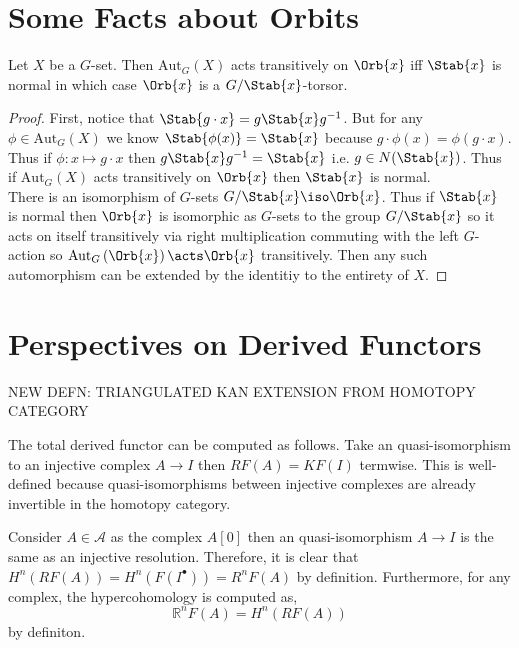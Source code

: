 \documentclass[12pt]{article}
\begin{document}
\section{Some Facts about Orbits}

\renewcommand{\Aut}[2]{\mathrm{Aut}_{#1}\left(#2 \right)}

\begin{prop}
Let $X$ be a $G$-set. Then $\Aut{G}{X}$ acts transitively on $\Orb{x}$ iff $\Stab{x}$ is normal in which case $\Orb{x}$ is a $G/\Stab{x}$-torsor.
\end{prop}

\begin{proof}
First, notice that $\Stab{g \cdot x} = g \Stab{x} g^{-1}$. But for any $\phi \in \Aut{G}{X}$ we know $\Stab{\phi(x)} = \Stab{x}$ because $g \cdot \phi(x) = \phi(g \cdot x)$. Thus if $\phi : x \mapsto g \cdot x$ then $g \Stab{x} g^{-1} = \Stab{x}$ i.e. $g \in N(\Stab{x})$. Thus if $\Aut{G}{X}$ acts transitively on $\Orb{x}$ then $\Stab{x}$ is normal.
\bigskip\\
There is an isomorphism of $G$-sets $G / \Stab{x} \iso \Orb{x}$. Thus if $\Stab{x}$ is normal then $\Orb{x}$ is isomorphic as $G$-sets to the group $G / \Stab{x}$ so it acts on itself transitively via right multiplication commuting with the left $G$-action so $\Aut{G}{\Orb{x}} \acts \Orb{x}$ transitively. Then any such automorphism can be extended by the identitiy to the entirety of $X$.
\end{proof}

\section{Perspectives on Derived Functors}

\renewcommand{\A}{\mathcal{A}}
\newcommand{\B}{\mathcal{B}}

NEW DEFN: TRIANGULATED KAN EXTENSION FROM HOMOTOPY CATEGORY 

\begin{rmk}
The total derived functor can be computed as follows. Take an quasi-isomorphism to an injective complex $A \to I$ then $RF(A) = KF(I)$ termwise. This is well-defined because quasi-isomorphisms between injective complexes are already invertible in the homotopy category.
\end{rmk}

\begin{rmk}
Consider $A \in \mathcal{A}$ as the complex $A[0]$ then an quasi-isomorphism $A \to I$ is the same as an injective resolution. Therefore, it is clear that $H^n(RF(A)) = H^n(F(I^\bullet)) = R^n F(A)$ by definition. Furthermore, for any complex, the hypercohomology is computed as, 
\[ \mathbb{R}^n F(A) = H^n(RF(A)) \]
by definiton.
\end{rmk}
\end{document}
